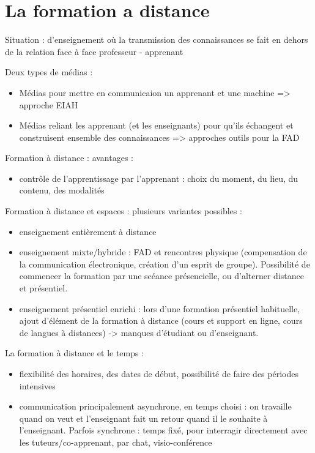 \section{La formation a distance}
Situation : d'enseignement où la transmission des connaissances se fait en dehors de la relation face à face professeur - apprenant

\vskip 1cm
Deux types de médias :
\begin{itemize}
	\item Médias pour mettre en communicaion un apprenant et une machine => approche EIAH
	\item Médias reliant les apprenant (et les enseignants) pour qu'ils échangent et construisent ensemble des connaissances => approches outils pour la FAD
\end{itemize}

\vskip 1cm

Formation à distance : avantages :
\begin{itemize}
	\item contrôle de l'apprentissage par l'apprenant : choix du moment, du lieu, du contenu, des modalités
\end{itemize}

\vskip 1cm
Formation à distance et espaces : plusieurs variantes possibles :
\begin{itemize}
	\item enseignement entièrement à distance
	\item enseignement mixte/hybride : FAD et rencontres physique (compensation de la communication électronique, création d'un esprit de groupe). Possibilité de commencer la formation par une scéance présencielle, ou d'alterner distance et présentiel.
	\item enseignement présentiel enrichi : lors d'une formation présentiel habituelle, ajout d'élément de la formation à distance (cours et support en ligne, cours de langues à distances) -> manques d'étudiant ou d'enseignant.
\end{itemize}

\vskip 1cm
La formation à distance et le temps :
\begin{itemize}
	\item flexibilité des horaires, des dates de début, possibilité de faire des périodes intensives
	\item communication principalement asynchrone, en temps choisi : on travaille quand on veut et l'enseignant fait un retour quand il le souhaite à l'enseignant. Parfois synchrone : temps fixé, pour interragir directement avec les tuteurs/co-apprenant, par chat, visio-conférence
\end{itemize}
\vskip 1cm

